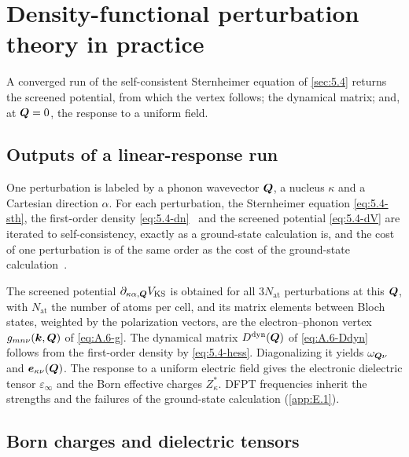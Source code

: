 \section{Density-functional perturbation theory in practice}\label{app:E.4}

A converged run of the self-consistent Sternheimer equation of \cref{sec:5.4} returns the screened potential, from which the vertex follows; the dynamical matrix; and, at $\bm{Q} = 0$, the response to a uniform field.

\subsection{Outputs of a linear-response run}

One perturbation is labeled by a phonon wavevector $\bm{Q}$, a nucleus $\kappa$ and a Cartesian direction $\alpha$. For each perturbation, the Sternheimer equation \cref{eq:5.4-sth}, the first-order density \cref{eq:5.4-dn}~\cite[Eq.~(49)]{giustino2017electron} and the screened potential \cref{eq:5.4-dV} are iterated to self-consistency, exactly as a ground-state calculation is, and the cost of one perturbation is of the same order as the cost of the ground-state calculation~\cite[Sect.~II.C]{baroni2001phonons}.

The screened potential $\partial_{\kappa\alpha,\bm{Q}}V_{\mathrm{KS}}$ is obtained for all $3N_{\mathrm{at}}$ perturbations at this $\bm{Q}$, with $N_{\mathrm{at}}$ the number of atoms per cell, and its matrix elements between Bloch states, weighted by the polarization vectors, are the electron--phonon vertex $g_{mn\nu}(\bm{k},\bm{Q})$ of \cref{eq:A.6-g}. The dynamical matrix $D^{\mathrm{dyn}}(\bm{Q})$ of \cref{eq:A.6-Ddyn} follows from the first-order density by \cref{eq:5.4-hess}. Diagonalizing it yields $\omega_{\bm{Q}\nu}$ and $\bm{e}_{\kappa\nu}(\bm{Q})$. The response to a uniform electric field gives the electronic dielectric tensor $\varepsilon_\infty$ and the Born effective charges $Z^*_\kappa$. DFPT frequencies inherit the strengths and the failures of the ground-state calculation (\cref{app:E.1}).

\subsection{Born charges and dielectric tensors}


